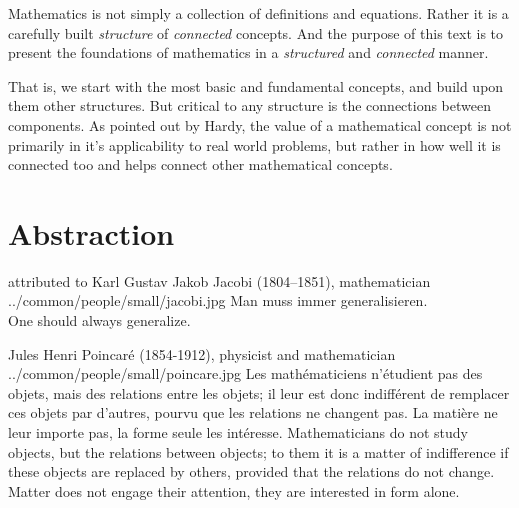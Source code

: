Mathematics is not simply a collection of definitions and equations.
Rather it is a carefully built \emph{structure} of \emph{connected} concepts.
And the purpose of this text is to present the foundations of mathematics
in a {\em structured} and {\em connected} manner.

That is, we start with the most basic and fundamental concepts,
and build upon them other structures.
But critical to any structure is the connections between components.
As pointed out by Hardy, the value of a mathematical concept is not primarily in
it's applicability to real world problems,
but rather in how well it is connected too and helps connect other mathematical concepts.

\section*{Abstraction}
\qboxnps
  { attributed to Karl Gustav Jakob Jacobi (1804--1851), mathematician
    \footnotemark
  }
  {../common/people/small/jacobi.jpg}
  {Man muss immer generalisieren.\quotec \\
   \quoteo One should always generalize.}

\qboxnpqt
  { Jules Henri Poincar\'e (1854-1912), physicist and mathematician
    \footnotemark
  }
  {../common/people/small/poincare.jpg}
  {Les math\'ematiciens n'\'etudient pas des objets, 
   mais des relations entre les objets; 
   il leur est donc indiff\'erent de remplacer ces objets par d'autres, 
   pourvu que les relations ne changent pas. 
   La mati\`ere ne leur importe pas, la forme seule les int\'eresse.}
  {Mathematicians do not study objects, but the relations between objects;
   to them it is a matter of indifference if these objects are replaced by others,
   provided that the relations do not change.
   Matter does not engage their attention,
   they are interested in form alone.}

